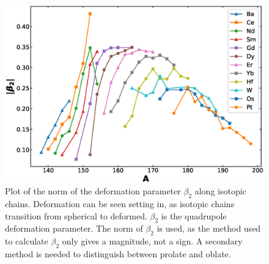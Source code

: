 \begin{figure}[!]
    \centering
    \includegraphics[scale=0.5]{Introduction_Figs/beta.eps}
    \caption{Plot of the norm of the deformation parameter $\beta_2$ along isotopic chains. Deformation can be seen setting in, as isotopic chains transition from spherical to deformed. $\beta_2$ is the quadrupole deformation parameter. The norm of $\beta_2$ is used, as the method used to calculate $\beta_2$ only gives a magnitude, not a sign. A secondary method is needed to distinguish between prolate and oblate.}
    \label{fig:beta_by_isotope}
\end{figure}